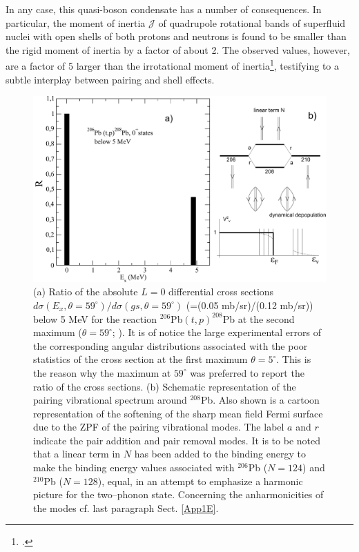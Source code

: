 In any case, this quasi-boson condensate has a number of consequences. In particular, the moment of inertia $\mathcal J$ of quadrupole rotational bands of superfluid nuclei with open shells of both protons and neutrons is found to be smaller than the rigid moment of inertia by a factor of about 2. The observed values, however, are a factor of 5 larger than the irrotational moment of inertia\footnote{\cite{Bohr:75,Belyaev:59,Belyaev:13}.}, testifying to a subtle interplay between pairing and shell effects.
\begin{figure}
\centerline{\includegraphics*[width=\textwidth,angle=0]{nutshell/figs/Excited0Pb206tp.pdf}}
\caption{(a) Ratio of the absolute $L=0$ differential cross sections $d\sigma(E_x,\theta=59^{\circ})/d\sigma(gs,\theta=59^{\circ})$ (=(0.05 mb/sr)/(0.12 mb/sr)) below 5 MeV  for the reaction $^{206}$Pb$(t,p)^{208}$Pb at the second maximum ($\theta=59^{\circ}$; \cite{Bjerregaard:66b}). It is of notice the large experimental errors of the corresponding angular distributions associated with the poor statistics of the cross section at the first maximum $\theta=5^{\circ}$. This is the reason why the maximum at $59^\circ$ was preferred to report the ratio of the cross sections. (b) Schematic representation of the pairing vibrational spectrum around $^{208}$Pb. Also shown is a cartoon representation of the softening of the sharp mean field Fermi surface due to the ZPF of the pairing vibrational modes. The label $a$ and $r$ indicate the pair addition and pair removal modes. It is to be noted that a linear term in $N$ has been added to the binding energy to make the binding energy values associated with $^{206}$Pb ($N=124$) and $^{210}$Pb ($N=128$), equal, in an attempt to emphasize a harmonic picture for the two--phonon state. Concerning the anharmonicities of the modes cf. last paragraph Sect. \ref{App1E}.}\label{fig1.1}
\end{figure}



